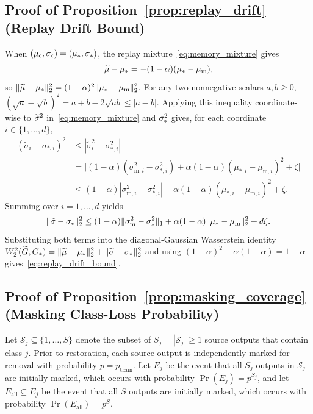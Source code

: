 \subsection{Proof of Proposition~\ref{prop:replay_drift} (Replay Drift Bound)}
When $(\mu_{\mathrm c},\sigma_{\mathrm c})=(\mu_*,\sigma_*)$, the replay mixture~\eqref{eq:memory_mixture} gives
\begin{equation}
 \widetilde{\mu} - \mu_* = -(1-\alpha)(\mu_* - \mu_{\mathrm m}),
\end{equation}
so $\|\widetilde{\mu} - \mu_*\|_2^2 = (1-\alpha)^2\|\mu_* - \mu_{\mathrm m}\|_2^2$. For any two nonnegative scalars $a,b\ge 0$, $(\sqrt{a}-\sqrt{b})^2 = a + b - 2\sqrt{ab} \le |a-b|$. Applying this inequality coordinate-wise to $\widetilde{\sigma}^2$ in~\eqref{eq:memory_mixture} and $\sigma_*^2$ gives, for each coordinate $i\in\{1,\ldots,d\}$,
\begin{align}
 (\widetilde\sigma_i - \sigma_{*,i})^2
 &\le |\widetilde\sigma_i^2 - \sigma_{*,i}^2| \nonumber\\
 &= \bigl|(1-\alpha)(\sigma_{\mathrm m,i}^2 - \sigma_{*,i}^2)
 + \alpha(1-\alpha)(\mu_{*,i} - \mu_{\mathrm m,i})^2 + \zeta\bigr| \nonumber\\
 &\le (1-\alpha)|\sigma_{\mathrm m,i}^2 - \sigma_{*,i}^2|
 + \alpha(1-\alpha)(\mu_{*,i} - \mu_{\mathrm m,i})^2 + \zeta.
\end{align}
Summing over $i=1,\ldots,d$ yields
\begin{equation}
 \|\widetilde{\sigma} - \sigma_*\|_2^2
 \le (1-\alpha)\|\sigma_{\mathrm m}^2 - \sigma_*^2\|_1
 + \alpha(1-\alpha)\|\mu_* - \mu_{\mathrm m}\|_2^2 + d\zeta.
\end{equation}
Substituting both terms into the diagonal-Gaussian Wasserstein identity $W_2^2(\widetilde G,G_*)=\|\widetilde{\mu}-\mu_*\|_2^2+\|\widetilde{\sigma}-\sigma_*\|_2^2$ and using $(1-\alpha)^2 + \alpha(1-\alpha) = 1-\alpha$ gives~\eqref{eq:replay_drift_bound}.

\subsection{Proof of Proposition~\ref{prop:masking_coverage} (Masking Class-Loss Probability)}
Let $\mathcal S_j\subseteq\{1,\ldots,S\}$ denote the subset of $S_j = |\mathcal S_j|\ge 1$ source outputs that contain class $j$. Prior to restoration, each source output is independently marked for removal with probability $p=p_{\mathrm{train}}$. Let $E_j$ be the event that all $S_j$ outputs in $\mathcal S_j$ are initially marked, which occurs with probability $\Pr(E_j)=p^{S_j}$, and let $E_{\mathrm{all}}\subseteq E_j$ be the event that all $S$ outputs are initially marked, which occurs with probability $\Pr(E_{\mathrm{all}})=p^S$.


